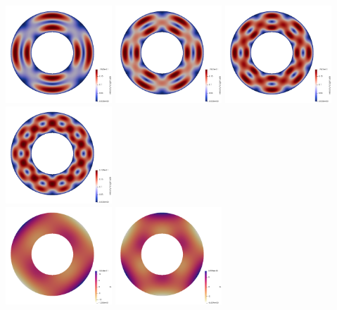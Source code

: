 \newpage
\begin{center}
\includegraphics[width=4cm]{python_codes/fieldstone_35/results/vel_k2}
\includegraphics[width=4cm]{python_codes/fieldstone_35/results/vel_k3}
\includegraphics[width=4cm]{python_codes/fieldstone_35/results/vel_k4}
\includegraphics[width=4cm]{python_codes/fieldstone_35/results/vel_k5}\\
\includegraphics[width=4cm]{python_codes/fieldstone_35/results/p_k2}
\includegraphics[width=4cm]{python_codes/fieldstone_35/results/p_k3}

\end{center}
